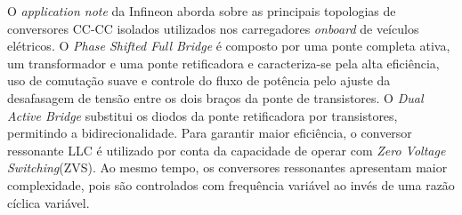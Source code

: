 O \textit{application note} da Infineon \cite{Infineon_CoolMOS_CFD7A} aborda sobre as
principais topologias de conversores CC-CC isolados utilizados nos carregadores
\textit{onboard} de veículos elétricos. O \textit{Phase Shifted Full Bridge} é composto por uma
ponte completa ativa, um transformador e uma ponte retificadora e caracteriza-se pela alta
eficiência, uso de comutação suave e controle do fluxo de potência pelo ajuste da desafasagem
de tensão entre os dois braços da ponte de transistores. O \textit{Dual Active Bridge}
substitui os diodos da ponte retificadora por transistores, permitindo a bidirecionalidade.
Para garantir maior eficiência, o conversor ressonante LLC é utilizado por conta da capacidade
de operar com \textit{Zero Voltage Switching}(ZVS). Ao mesmo tempo, os conversores ressonantes
apresentam maior complexidade, pois são controlados com frequência variável ao invés de uma
razão cíclica variável.


